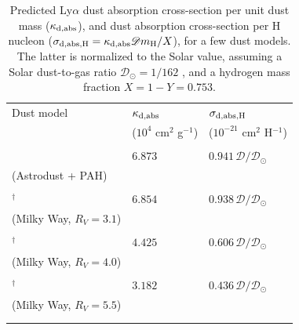 \documentclass[fleqn,usenatbib]{mnras}
\begin{document}
\begin{table}
\caption{Predicted Ly$\alpha$ dust absorption cross-section per unit dust mass ($\kappa_{\rm d,abs}$), and dust absorption cross-section per H nucleon ($\sigma_{\rm d,abs,H} = \kappa_{\rm d,abs} \mathscr{D}m_{\rm H}/X$), for a few dust models. The latter is normalized to the Solar value, assuming a Solar dust-to-gas ratio $\mathscr{D}_{\odot} = 1/162$ \citep{Remy2014}, and a hydrogen mass fraction $X = 1-Y = 0.753$.}
\begin{tabular}{l l l}
\hline
\hline
Dust model & $\kappa_{\rm d,abs}$ & $\sigma_{\rm d,abs,H}$  \\
 & ($10^4$ cm$^{2}$ g$^{-1}$) & ($10^{-21}$ cm$^{2}$ H$^{-1}$)  \\

\hline
\hline

\\
\vspace{3 pt}

\cite{Hensley2023} & $6.873$ & $0.941 \, \mathscr{D}/\mathscr{D}_{\odot}$ \\
(Astrodust + PAH) & &  \\ \\

\vspace{3 pt}

\cite{WeingartnerDraine2001}$^\dagger$ & $6.854$ & $0.938 \, \mathscr{D}/\mathscr{D}_{\odot}$  \\

(Milky Way, $R_V = 3.1$) & &  \\ \\

\vspace{3 pt}

\cite{WeingartnerDraine2001}$^\dagger$ & $4.425$ &  $0.606 \, \mathscr{D}/\mathscr{D}_{\odot}$ \\

 (Milky Way, $R_V = 4.0$) & &  \\ \\

\vspace{3 pt}

\cite{WeingartnerDraine2001}$^\dagger$ & $3.182$ & $0.436 \, \mathscr{D}/\mathscr{D}_{\odot}$ \\
 (Milky Way, $R_V = 5.5$) & &  \\ \\

 \vspace{3 pt}


\end{tabular}
\end{table}
\end{document}
